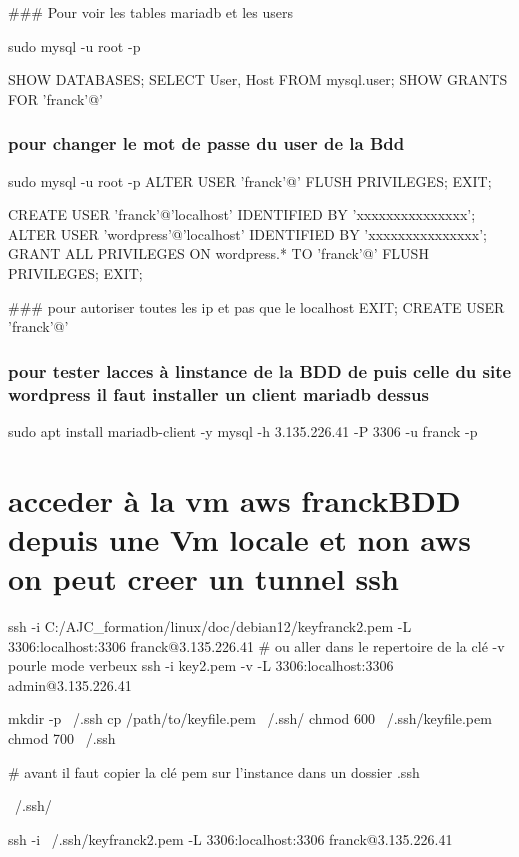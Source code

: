 \#\#\# Pour voir les tables mariadb et les users 
\begin{DoxyCode}
sudo mysql -u root -p

SHOW DATABASES;
SELECT User, Host FROM mysql.user;
SHOW GRANTS FOR 'franck'@'%
\end{DoxyCode}


\subsubsection*{pour changer le mot de passe du user de la Bdd}


\begin{DoxyCode}
sudo mysql -u root -p
ALTER USER 'franck'@'%
FLUSH PRIVILEGES;
EXIT;

CREATE USER 'franck'@'localhost' IDENTIFIED BY 'xxxxxxxxxxxxxxx';
ALTER USER 'wordpress'@'localhost' IDENTIFIED BY 'xxxxxxxxxxxxxxx';
GRANT ALL PRIVILEGES ON wordpress.* TO 'franck'@'%
FLUSH PRIVILEGES;
EXIT;

### pour autoriser toutes les ip et pas que le localhost
EXIT;
CREATE USER 'franck'@'%
\end{DoxyCode}


\subsubsection*{pour tester l\textquotesingle{}acces à l\textquotesingle{}instance de la B\+DD de puis celle du site wordpress il faut installer un client mariadb dessus}


\begin{DoxyCode}
sudo apt install mariadb-client -y
mysql -h 3.135.226.41 -P 3306 -u franck -p
\end{DoxyCode}


\section*{acceder à la vm aws franck\+B\+DD depuis une Vm locale et non aws on peut creer un tunnel ssh}


\begin{DoxyCode}
ssh -i  C:/AJC\_formation/linux/doc/debian12/keyfranck2.pem  -L 3306:localhost:3306 franck@3.135.226.41
# ou aller dans le repertoire de la clé -v pourle mode verbeux
ssh -i key2.pem -v -L 3306:localhost:3306 admin@3.135.226.41

mkdir -p ~/.ssh
cp /path/to/keyfile.pem ~/.ssh/
chmod 600 ~/.ssh/keyfile.pem
chmod 700 ~/.ssh

# avant il faut copier la clé pem sur l'instance dans un dossier .ssh

~/.ssh/

ssh -i ~/.ssh/keyfranck2.pem -L 3306:localhost:3306 franck@3.135.226.41
\end{DoxyCode}



